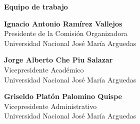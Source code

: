 \begin{center}
{\bf \Huge Equipo de trabajo}
\end{center}
\vspace{1cm}

\begin{center}
\textbf{Ignacio Antonio Ramírez Vallejos}\\
Presidente de la Comisión Organizadora \\
Universidad Nacional José María Arguedas \\
\end{center}

\begin{center}
\textbf{Jorge Alberto Che Piu Salazar}\\
Vicepresidente Académico \\
Universidad Nacional José María Arguedas \\
\end{center}

\begin{center}
\textbf{Griseldo Platón Palomino Quispe}\\
Vicepresidente Administrativo \\
Universidad Nacional José María Arguedas \\
\end{center}






